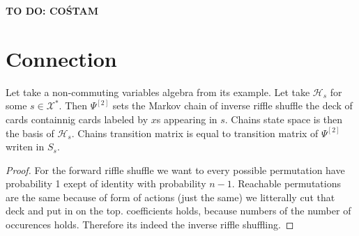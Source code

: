 \documentclass[a4paper, 12pt]{report}
\newcommand{\todo}[1]{\hfill \break \textbf{\Huge TO DO: #1 \hfill \break}\normalsize}
\begin{document}
\todo{COŚTAM}
\chapter{Connection}
Let take a non-commuting variables algebra from its example. Let take $\mathcal{H}_s$ for some 
$s \in \mathcal{X}^*$. Then $\Psi^{[2]}$ sets the Markov chain of inverse riffle shuffle the deck of cards 
containnig cards labeled by $x$s appearing in $s$. Chains state space is then the basis of $\mathcal{H}_s$. 
Chains transition matrix is equal to transition matrix of $\Psi^{[2]}$ writen in $S_s$.  \\
\begin{proof}
For the forward riffle shuffle we want to every possible permutation have probability 1 exept of identity 
with probability $n-1$. Reachable permutations are the same because of form of actions (just the same)
we litterally cut that deck and put in on the top. coefficients holds, because numbers of the number of 
occurences holds. Therefore its indeed the inverse riffle shuffling.
\end{proof}
\end{document}
